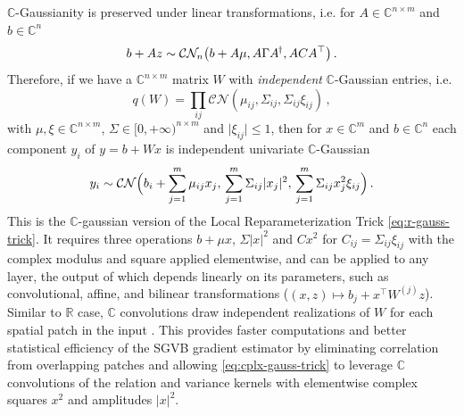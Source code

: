 \documentclass[a4paper,10pt,twocolumn]{article}
\newcommand{\real}{\mathbb{R}}
\newcommand{\cplx}{\mathbb{C}}
\newcommand{\hop}{{\mkern-1.5mu\dagger}}
\begin{document}
$\cplx$-Gaussianity is preserved under linear transformations, i.e. for $
  A \in \cplx^{n \times m}
$ and $b \in \cplx^{n}$
\begin{equation}  \label{eq:cn-affine}
  b + A z \sim \mathcal{C}\mathcal{N}_n\bigl(
      b + A\mu, A \Gamma A^{\hop}, A C A^\top
    \bigr)
  \,.
\end{equation}
Therefore, if we have a $\cplx^{n\times m}$ matrix $W$ with \emph{independent}
$\cplx$-Gaussian entries, i.e.
\begin{equation}  \label{eq:c-gauss-vi-general}
  q(W)
    = \prod_{ij} \mathcal{CN}(
      \mu_{ij}, \Sigma_{ij}, \Sigma_{ij} \xi_{ij}
    )
  \,,
\end{equation}
with $
  \mu, \xi \in \cplx^{n\times m}
$, $\Sigma \in [0, +\infty)^{n\times m}$ and $
  \lvert \xi_{ij} \rvert \leq 1
$, then for $x \in \cplx^m$ and $b \in \cplx^n$ each component $y_i$ of $y = b + W x$
is independent univariate $\cplx$-Gaussian
\begin{equation}  \label{eq:cplx-gauss-trick}
  y_i
    \sim \mathcal{C}\mathcal{N}
      \Bigl(
        b_i + \sum_{j=1}^m \mu_{ij} x_j,
        \, \sum_{j=1}^m \Sigma_{ij} \lvert x_j \rvert^2,
        \, \sum_{j=1}^m \Sigma_{ij} x_j^2 \xi_{ij}
      \Bigr)
    \,.
\end{equation}
This is the $\cplx$-gaussian version of the Local Reparameterization Trick \eqref{eq:r-gauss-trick}.
It requires three operations $b + \mu x$, $\Sigma \lvert x \rvert^2$ and $C x^2$ for
$C_{ij} = \Sigma_{ij} \xi_{ij}$ with the complex modulus and square applied elementwise,
and can be applied to any layer, the output of which depends linearly on its parameters,
such as convolutional, affine, and bilinear transformations ($
  (x, z) \mapsto b_j + x^\top W^{(j)} z
$). Similar to $\real$ case, $\cplx$ convolutions draw independent realizations of $W$
for each spatial patch in the input \citep{molchanov_variational_2017}. This provides
faster computations and better statistical efficiency of the SGVB gradient estimator
by eliminating correlation from overlapping patches \citep{kingma_variational_2015} and
allowing \eqref{eq:cplx-gauss-trick} to leverage $\cplx$ convolutions of the relation
and variance kernels with elementwise complex squares $x^2$ and amplitudes $\lvert x \rvert^2$.
\end{document}
